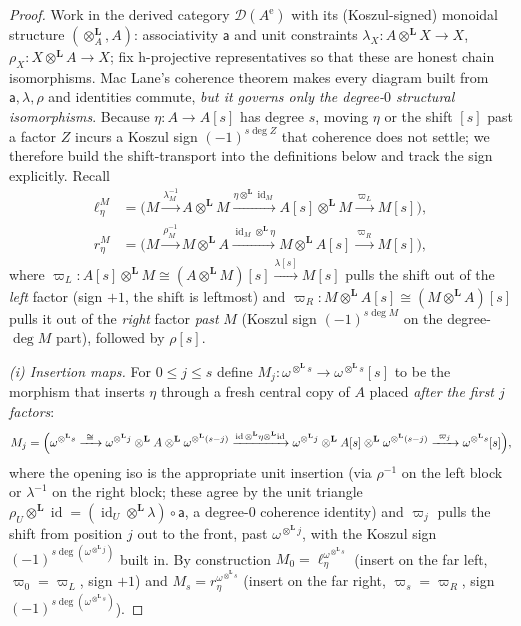 \documentclass[11pt]{amsart}
\theoremstyle{definition}
\newcommand{\id}{\operatorname{id}}
\newcommand{\Ae}{A^{\mathrm{e}}}
\newcommand{\der}{\mathcal{D}}
\newcommand{\Lotimes}{\otimes^{\mathbf{L}}}
\begin{document}
\begin{proof}
Work in the derived category $\der(\Ae)$ with its (Koszul-signed) monoidal
structure $(\Lotimes_A,A)$: associativity $\mathsf a$ and unit constraints
$\lambda_X\colon A\Lotimes X\to X$, $\rho_X\colon X\Lotimes A\to X$; fix
h-projective representatives so that these are honest chain isomorphisms.
Mac Lane's coherence theorem makes every diagram built from
$\mathsf a,\lambda,\rho$ and identities commute, \emph{but it governs only
the degree-$0$ structural isomorphisms}. Because $\eta\colon A\to A[s]$ has
degree $s$, moving $\eta$ or the shift $[s]$ past a factor $Z$ incurs a Koszul
sign $(-1)^{s\deg Z}$ that coherence does not settle; we therefore build the
shift-transport into the definitions below and track the sign explicitly.
Recall
\begin{align*}
\ell^M_\eta&=\bigl(M\xrightarrow{\lambda_M^{-1}}A\Lotimes M
\xrightarrow{\eta\Lotimes\id_M}A[s]\Lotimes M
\xrightarrow{\ \varpi_L\ }M[s]\bigr),\\
r^M_\eta&=\bigl(M\xrightarrow{\rho_M^{-1}}M\Lotimes A
\xrightarrow{\id_M\Lotimes\eta}M\Lotimes A[s]
\xrightarrow{\ \varpi_R\ }M[s]\bigr),
\end{align*}
where $\varpi_L\colon A[s]\Lotimes M\cong(A\Lotimes M)[s]\xrightarrow{\lambda[s]}M[s]$
pulls the shift out of the \emph{left} factor (sign $+1$, the shift is
leftmost) and $\varpi_R\colon M\Lotimes A[s]\cong(M\Lotimes A)[s]$ pulls it out
of the \emph{right} factor \emph{past} $M$ (Koszul sign $(-1)^{s\deg M}$ on the
degree-$\deg M$ part), followed by $\rho[s]$.

\emph{(i) Insertion maps.} For $0\le j\le s$ define
$M_j\colon\omega^{\Lotimes s}\to\omega^{\Lotimes s}[s]$ to be the morphism that
inserts $\eta$ through a fresh central copy of $A$ placed \emph{after the first
$j$ factors}:
\[
M_j=\Bigl(\omega^{\Lotimes s}\xrightarrow{\ \cong\ }
\omega^{\Lotimes j}\Lotimes A\Lotimes\omega^{\Lotimes(s-j)}
\xrightarrow{\id\Lotimes\eta\Lotimes\id}
\omega^{\Lotimes j}\Lotimes A[s]\Lotimes\omega^{\Lotimes(s-j)}
\xrightarrow{\ \varpi_j\ }\omega^{\Lotimes s}[s]\Bigr),
\]
where the opening iso is the appropriate unit insertion (via $\rho^{-1}$ on the
left block or $\lambda^{-1}$ on the right block; these agree by the unit
triangle $\rho_U\Lotimes\id=(\id_U\Lotimes\lambda)\circ\mathsf a$, a degree-$0$
coherence identity) and $\varpi_j$ pulls the shift from position $j$ out to the
front, past $\omega^{\Lotimes j}$, with the Koszul sign $(-1)^{s\deg(\omega^{\Lotimes j})}$
built in. By construction $M_0=\ell^{\omega^{\Lotimes s}}_\eta$ (insert on the
far left, $\varpi_0=\varpi_L$, sign $+1$) and $M_s=r^{\omega^{\Lotimes s}}_\eta$
(insert on the far right, $\varpi_s=\varpi_R$, sign $(-1)^{s\deg(\omega^{\Lotimes s})}$).


\end{proof}
\end{document}
